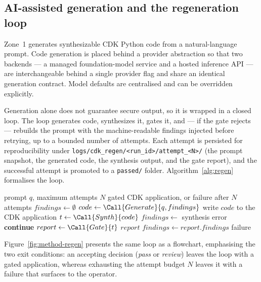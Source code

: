 \subsection{AI-assisted generation and the regeneration loop}
\label{subsec:method-generation}

Zone~1 generates synthesizable CDK Python code from a natural-language prompt. Code
generation is placed behind a provider abstraction so that two backends --- a managed
foundation-model service and a hosted inference API --- are interchangeable behind a
single provider flag and share an identical generation contract. Model defaults are
centralised and can be overridden explicitly.

Generation alone does not guarantee secure output, so it is wrapped in a closed loop.
The loop generates code, synthesizes it, gates it, and --- if the gate rejects ---
rebuilds the prompt with the machine-readable findings injected before retrying, up to a
bounded number of attempts. Each attempt is persisted for reproducibility under
\texttt{logs/cdk\_regen/<run\_id>/attempt\_<N>/} (the prompt snapshot, the generated
code, the synthesis output, and the gate report), and the successful attempt is promoted
to a \texttt{passed/} folder. Algorithm~\ref{alg:regen} formalises the loop.

\begin{algorithm}[ht]
\caption{Generate--synthesize--gate--regenerate loop}
\label{alg:regen}
\begin{algorithmic}[1]
\Require prompt $q$, maximum attempts $N$
\Ensure gated CDK application, or failure after $N$ attempts
\State $findings \gets \emptyset$
    \State $code \gets \Call{Generate}{q, findings}$
    \State write $code$ to the CDK application
    \State $t \gets \Call{Synth}{code}$ 
        \State $findings \gets$ synthesis error
        \State \textbf{continue}
    \EndIf
    \State $report \gets \Call{Gate}{t}$
        \State \Return $report$ 
    \EndIf
    \State $findings \gets report.findings$ 
\EndFor
\State \Return failure
\end{algorithmic}
\end{algorithm}

Figure~\ref{fig:method-regen} presents the same loop as a flowchart, emphasising the two
exit conditions: an accepting decision (\emph{pass} or \emph{review}) leaves the loop
with a gated application, whereas exhausting the attempt budget $N$ leaves it with a
failure that surfaces to the operator.

